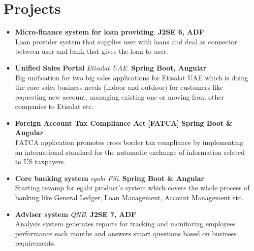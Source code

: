 \documentclass[]{friggeri-cv}
\begin{document}
\section{Projects}
\begin{itemize}
    \item \textbf{Micro-finance system for loan providing}.  \hfill \textbf{J2SE 6, ADF} \\
    Loan provider system that supplies user with loans and deal as connector between user and bank that gives the loan to user.

    \item \textbf{ Unified Sales Portal} \textit{Etisalat UAE}. \hfill \textbf{Spring Boot, Angular} \\
 Big unification for two big sales applications for Etisalat UAE which is doing the core sales business needs (indoor and outdoor) for customers like requesting new account, managing existing one or moving from other companies to Etisalat etc.

	\item \textbf{Foreign Account Tax Compliance Act} \textbf{[FATCA]} \hfill \textbf{Spring Boot \& Angular} \\
	 FATCA application promotes cross border tax compliance by implementing an international standard for the automatic exchange of information related to US taxpayers. 
        
    
    \item \textbf{Core banking system} \textit{egabi FSi}. \hfill \textbf{Spring Boot \& Angular} \\
    Starting revamp for egabi product's system which covers the whole process of banking like General Ledger, Loan Management, Account Management etc.

    \item \textbf{Adviser system} \textit{QNB}. \hfill \textbf{J2SE 7, ADF} \\
    Analysis system generates reports for tracking and monitoring employees performance each months and  answers smart questions based on business requirements.
    
\end{itemize}
\end{document}
